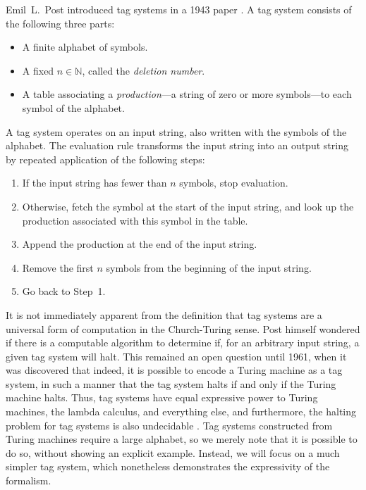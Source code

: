 \documentclass[../generics]{subfiles}
\begin{document}
Emil~L.~Post introduced tag systems in a 1943 paper \cite{posttag}. A tag system consists of the following three parts:
\begin{itemize}
\item A finite alphabet of symbols.
\item A fixed $n\in\mathbb{N}$, called the \emph{deletion number}.
\item A table associating a \emph{production}---a string of zero or more symbols---to each symbol of the alphabet.
\end{itemize}
A tag system operates on an input string, also written with the symbols of the alphabet. The evaluation rule transforms the input string into an output string by repeated application of the following steps:
\begin{enumerate}
\item If the input string has fewer than $n$ symbols, stop evaluation.
\item Otherwise, fetch the symbol at the start of the input string, and look up the production associated with this symbol in the table.
\item Append the production at the end of the input string.
\item Remove the first $n$ symbols from the beginning of the input string.
\item Go back to Step~1.
\end{enumerate}

It is not immediately apparent from the definition that tag systems are a universal form of computation in the Church-Turing sense. Post himself wondered if there is a computable algorithm to determine if, for an arbitrary input string, a given tag system will halt. This remained an open question until 1961, when it was discovered that indeed, it is possible to encode a Turing machine as a tag system, in such a manner that the tag system halts if and only if the Turing machine halts. Thus, tag systems have equal expressive power to Turing machines, the lambda calculus, and everything else, and furthermore, the halting problem for tag systems is also undecidable \cite{turingtag}. Tag systems constructed from Turing machines require a large alphabet, so we merely note that it is possible to do so, without showing an explicit example. Instead, we will focus on a much simpler tag system, which nonetheless demonstrates the expressivity of the formalism.
\end{document}
